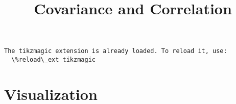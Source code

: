 \documentclass[float=false,crop=false]{standalone}
\title{Covariance and Correlation}
\begin{document}
    
    
    \maketitle
    
    

    \begin{Verbatim}[commandchars=\\\{\},fontsize=\footnotesize]
The tikzmagic extension is already loaded. To reload it, use:
  \%reload\_ext tikzmagic

    \end{Verbatim}

    \section{Visualization}\label{visualization}
\end{document}
